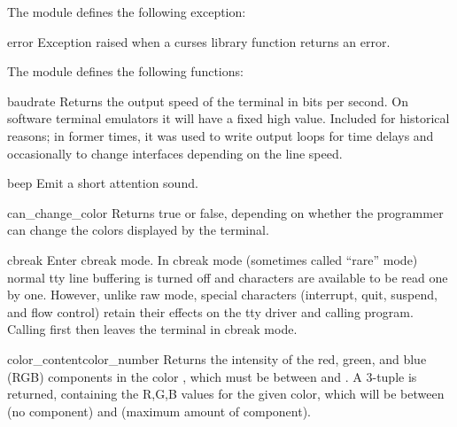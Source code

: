 The module  defines the following exception:

\begin{excdesc}{error}
Exception raised when a curses library function returns an error.
\end{excdesc}


The module  defines the following functions:

\begin{funcdesc}{baudrate}{}
Returns the output speed of the terminal in bits per second.  On
software terminal emulators it will have a fixed high value.
Included for historical reasons; in former times, it was used to 
write output loops for time delays and occasionally to change
interfaces depending on the line speed.
\end{funcdesc}

\begin{funcdesc}{beep}{}
Emit a short attention sound.
\end{funcdesc}

\begin{funcdesc}{can_change_color}{}
Returns true or false, depending on whether the programmer can change
the colors displayed by the terminal.
\end{funcdesc}

\begin{funcdesc}{cbreak}{}
Enter cbreak mode.  In cbreak mode (sometimes called ``rare'' mode)
normal tty line buffering is turned off and characters are available
to be read one by one.  However, unlike raw mode, special characters
(interrupt, quit, suspend, and flow control) retain their effects on
the tty driver and calling program.  Calling first 
then  leaves the terminal in cbreak mode.
\end{funcdesc}

\begin{funcdesc}{color_content}{color_number}
Returns the intensity of the red, green, and blue (RGB) components in
the color , which must be between  and
.  A 3-tuple is returned, containing the R,G,B values
for the given color, which will be between  (no component) and
 (maximum amount of component).
\end{funcdesc}


